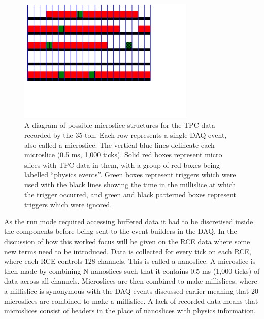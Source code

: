 \begin{figure}[h!]
  \centering
  \includegraphics[width=0.75\textwidth]{DataStructure}
  \caption[The 35 ton data structure]{A diagram of possible microslice structures for the TPC data recorded by the 35 ton. Each row represents a single DAQ event, also called a microslice. The vertical blue lines delineate each microslice (0.5 ms, 1,000 ticks). Solid red boxes represent micro slices with TPC data in them, with a group of red boxes being labelled ``physics events''. Green boxes represent triggers which were used with the black lines showing the time in the millislice at which the trigger occurred, and green and black patterned boxes represent triggers which were ignored.}
  \label{fig:DataStructure}
\end{figure}

As the run mode required accessing buffered data it had to be discretised inside the components before being sent to the event builders in the DAQ. In the discussion of how this worked focus will be given on the RCE data where some new terms need to be introduced. Data is collected for every tick on each RCE, where each RCE controls 128 channels. This is called a nanoslice. A microslice is then made by combining N nanoslices such that it contains 0.5 ms (1,000 ticks) of data across all channels. Microslices are then combined to make millislices, where a millislice is synonymous with the DAQ events discussed earlier meaning that 20 microslices are combined to make a millislice. A lack of recorded data means that microslices consist of headers in the place of nanoslices with physics information. \\

